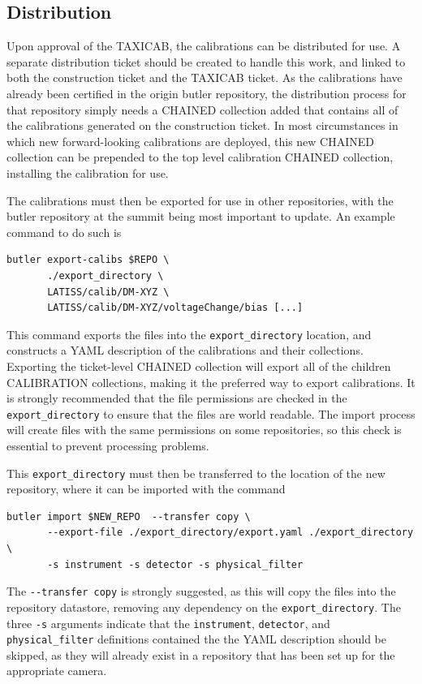 \documentclass[DM,authoryear,toc]{lsstdoc}
\begin{document}
\subsection{Distribution}
\label{sec:calib_export}
Upon approval of the TAXICAB, the calibrations can be distributed for use.
A separate distribution ticket should be created to handle this work, and linked to both the construction ticket and the TAXICAB ticket.
As the calibrations have already been certified in the origin butler repository, the distribution process for that repository simply needs a CHAINED collection added that contains all of the calibrations generated on the construction ticket.
In most circumstances in which new forward-looking calibrations are deployed, this new CHAINED collection can be prepended to the top level calibration CHAINED collection, installing the calibration for use.

The calibrations must then be exported for use in other repositories, with the butler repository at the summit being most important to update.  An example command to do such is
\begin{verbatim}
butler export-calibs $REPO \
       ./export_directory \
       LATISS/calib/DM-XYZ \
       LATISS/calib/DM-XYZ/voltageChange/bias [...]
\end{verbatim}
This command exports the files into the \verb|export_directory| location, and constructs a YAML description of the calibrations and their collections.
Exporting the ticket-level CHAINED collection will export all of the children CALIBRATION collections, making it the preferred way to export calibrations.
It is strongly recommended that the file permissions are checked in the \verb|export_directory| to ensure that the files are world readable.
The import process will create files with the same permissions on some repositories, so this check is essential to prevent processing problems.

This \verb|export_directory| must then be transferred to the location of the new repository, where it can be imported with the command
\begin{verbatim}
butler import $NEW_REPO  --transfer copy \
       --export-file ./export_directory/export.yaml ./export_directory \
       -s instrument -s detector -s physical_filter
\end{verbatim}

The \verb|--transfer copy| is strongly suggested, as this will copy the files into the repository datastore, removing any dependency on the \verb|export_directory|.
The three \verb|-s| arguments indicate that the \verb|instrument|, \verb|detector|, and \verb|physical_filter| definitions contained the the YAML description should be skipped, as they will already exist in a repository that has been set up for the appropriate camera.
\end{document}

